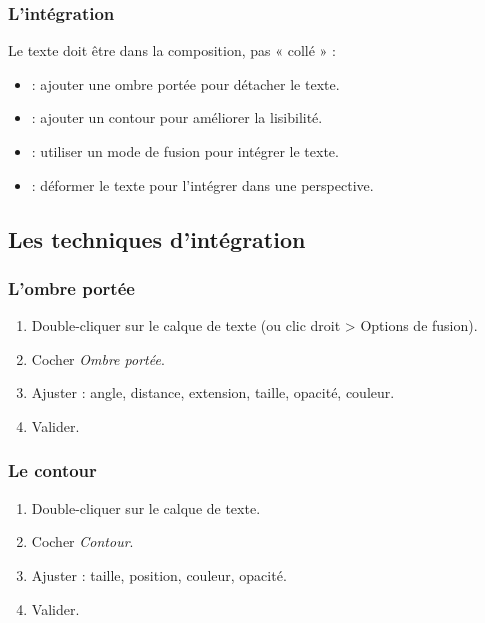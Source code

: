 \subsubsection{L'intégration}

Le texte doit être  dans la composition, pas « collé » :

\begin{itemize}
    \item {} : ajouter une ombre portée pour détacher le texte.
    \item {} : ajouter un contour pour améliorer la lisibilité.
    \item {} : utiliser un mode de fusion pour intégrer le texte.
    \item {} : déformer le texte pour l'intégrer dans une perspective.
\end{itemize}

\subsection{Les techniques d'intégration}

\subsubsection{L'ombre portée}

\begin{enumerate}
    \item Double-cliquer sur le calque de texte (ou clic droit > Options de fusion).
    \item Cocher \emph{Ombre portée}.
    \item Ajuster : angle, distance, extension, taille, opacité, couleur.
    \item Valider.
\end{enumerate}

\subsubsection{Le contour}

\begin{enumerate}
    \item Double-cliquer sur le calque de texte.
    \item Cocher \emph{Contour}.
    \item Ajuster : taille, position, couleur, opacité.
    \item Valider.
\end{enumerate}

